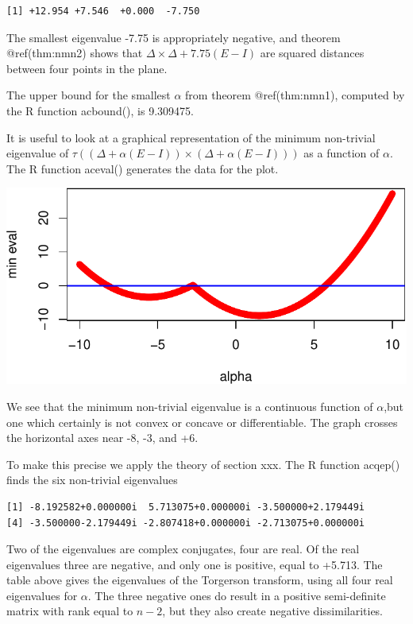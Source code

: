 \documentclass[
  12pt,
  letterpaper,
  DIV=11,
  numbers=noendperiod]{scrreprt}
\theoremstyle{remark}
\begin{document}
\begin{verbatim}
[1] +12.954 +7.546  +0.000  -7.750 
\end{verbatim}

The smallest eigenvalue -7.75 is appropriately negative, and theorem
@ref(thm:nmn2) shows that \(\Delta\times\Delta+7.75(E-I)\) are squared
distances between four points in the plane.

The upper bound for the smallest \(\alpha\) from theorem @ref(thm:nmn1),
computed by the R function acbound(), is 9.309475.

It is useful to look at a graphical representation of the minimum
non-trivial eigenvalue of
\(\tau((\Delta+\alpha(E-I))\times(\Delta+\alpha(E-I)))\) as a function
of \(\alpha\). The R function aceval() generates the data for the plot.

\includegraphics{interval_files/figure-pdf/acplot-1.pdf}

We see that the minimum non-trivial eigenvalue is a continuous function
of \(\alpha\),but one which certainly is not convex or concave or
differentiable. The graph crosses the horizontal axes near -8, -3, and
+6.

To make this precise we apply the theory of section xxx. The R function
acqep() finds the six non-trivial eigenvalues

\begin{verbatim}
[1] -8.192582+0.000000i  5.713075+0.000000i -3.500000+2.179449i
[4] -3.500000-2.179449i -2.807418+0.000000i -2.713075+0.000000i
\end{verbatim}

Two of the eigenvalues are complex conjugates, four are real. Of the
real eigenvalues three are negative, and only one is positive, equal to
+5.713. The table above gives the eigenvalues of the Torgerson
transform, using all four real eigenvalues for \(\alpha\). The three
negative ones do result in a positive semi-definite matrix with rank
equal to \(n-2\), but they also create negative dissimilarities.
\end{document}
